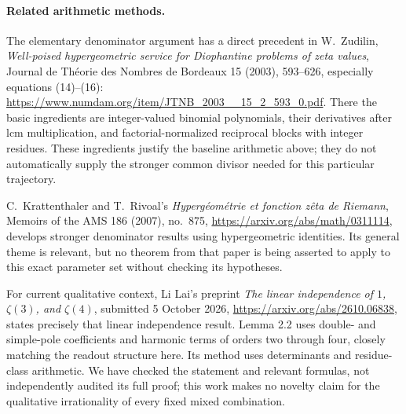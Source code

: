 \paragraph{Related arithmetic methods.}
The elementary denominator argument has a direct precedent in
W.~Zudilin, \emph{Well-poised hypergeometric service for Diophantine problems
of zeta values}, Journal de Th\'eorie des Nombres de Bordeaux
15 (2003), 593--626, especially equations (14)--(16):
\url{https://www.numdam.org/item/JTNB_2003__15_2_593_0.pdf}.
There the basic ingredients are integer-valued binomial polynomials,
their derivatives after lcm multiplication, and factorial-normalized
reciprocal blocks with integer residues. These ingredients justify the
baseline arithmetic above; they do not automatically supply the stronger
common divisor needed for this particular trajectory.

C.~Krattenthaler and T.~Rivoal's \emph{Hyperg\'eom\'etrie et fonction z\^eta de
Riemann}, Memoirs of the AMS 186 (2007), no.~875,
\url{https://arxiv.org/abs/math/0311114}, develops stronger denominator
results using hypergeometric identities. Its general theme is relevant,
but no theorem from that paper is being asserted to apply to this exact
parameter set without checking its hypotheses.

For current qualitative context, Li Lai's preprint
\emph{The linear independence of $1$, $\zeta(3)$, and $\zeta(4)$},
submitted 5 October 2026,
\url{https://arxiv.org/abs/2610.06838}, states precisely that linear
independence result. Lemma 2.2 uses double- and simple-pole coefficients
and harmonic terms of orders two through four, closely matching the
readout structure here. Its method uses determinants and residue-class
arithmetic. We have checked the statement and relevant formulas, not
independently audited its full proof; this work makes no novelty claim
for the qualitative irrationality of every fixed mixed combination.
